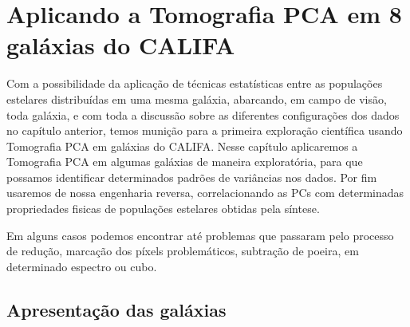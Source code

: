 


\chapter{Aplicando a Tomografia PCA em 8 galáxias do CALIFA}
\label{sec:result}

Com a possibilidade da aplicação de técnicas estatísticas entre as populações estelares distribuídas em uma mesma
galáxia, abarcando, em campo de visão, toda galáxia, e com toda a discussão sobre as diferentes configurações dos dados
no capítulo anterior, temos munição para a primeira exploração científica usando Tomografia PCA em galáxias do CALIFA.
Nesse capítulo aplicaremos a Tomografia PCA em algumas galáxias de maneira exploratória, para que possamos identificar
determinados padrões de variâncias nos dados. Por fim usaremos de nossa engenharia reversa, correlacionando as PCs com
determinadas propriedades fisicas de populações estelares obtidas pela síntese.

\ojo Em alguns casos podemos encontrar até problemas que passaram pelo processo de redução, marcação dos píxels
problemáticos, subtração de poeira, em determinado espectro ou cubo.

\section{Apresentação das galáxias}
\label{sec:result:apres}

